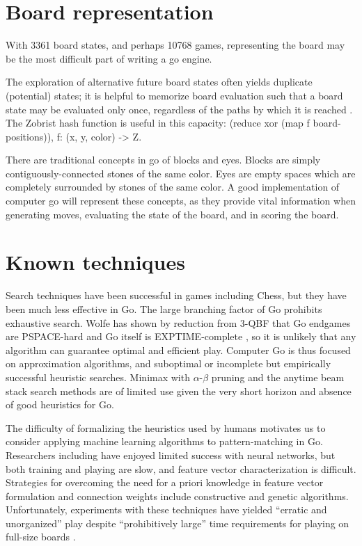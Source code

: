\documentclass{memoir}
\begin{document}
\section{Board representation}
With 3361 board states, and perhaps 10768 games, representing the board may be the most difficult part of writing a go engine.

The exploration of alternative future board states often yields duplicate (potential) states; it is helpful to memorize board evaluation such that a board state may be evaluated only once, regardless of the paths by which it is reached \cite{Zobrist1970b}. The Zobrist hash function is useful in this capacity: (reduce xor (map f board-positions)), f: (x, y, color) -> Z.

There are traditional concepts in go of blocks and eyes. Blocks are simply contiguously-connected stones of the same color. Eyes are empty spaces which are completely surrounded by stones of the same color. A good implementation of computer go will represent these concepts, as they provide vital information when generating moves, evaluating the state of the board, and in scoring the board. 

\section{Known techniques}
Search techniques have been successful in games including Chess, but they have been much less effective in Go. The large branching factor of Go prohibits exhaustive search. Wolfe has shown by reduction from 3-QBF that Go endgames are PSPACE-hard \cite{Wolfe} and Go itself is EXPTIME-complete \cite{Burmeister}, so it is unlikely that any algorithm can guarantee optimal and efficient play. Computer Go is thus focused on approximation algorithms, and suboptimal or incomplete but empirically successful heuristic searches. Minimax with $\alpha$-$\beta$ pruning and the anytime beam stack search methods are of limited use given the very short horizon and absence of good heuristics for Go.

The difficulty of formalizing the heuristics used by humans motivates us to consider applying machine learning algorithms to pattern-matching in Go. Researchers including \cite{Enzenberger96} have enjoyed limited success with neural networks, but both training and playing are slow, and feature vector characterization is difficult. Strategies for overcoming the need for a priori knowledge in feature vector formulation and connection weights include constructive and genetic algorithms. Unfortunately, experiments with these techniques have yielded ``erratic and unorganized'' play despite ``prohibitively large'' time requirements for playing on full-size boards \cite{RichardsMM98}.
\end{document}
